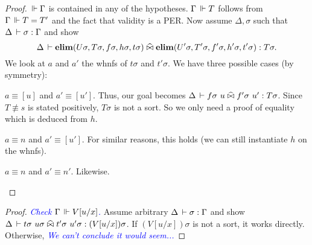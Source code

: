 \documentclass[a4paper,english]{lipics-utf8x}
\newcommand\meta[1]{\noindent\textcolor{blue}{\emph{#1}}}
\begin{document}
  \begin{proof}
    $\,\Vdash \Gamma$ is contained in any of the hypotheses.
    $\Gamma \,\Vdash T$ follows from $\Gamma \,\Vdash T = T'$ and the fact that validity
    is a PER.
    Now assume $\Delta, \sigma$ such that
    $\Delta \,\vdash \sigma : \Gamma$ and
    show
    \[\Delta \,\vdash \operatorname{\mathbf{elim}}(U \sigma,T \sigma,f \sigma,h \sigma,t \sigma) \mathrel{\widehat{\bowtie}}
    \operatorname{\mathbf{elim}}(U' \sigma,T' \sigma,f' \sigma,h' \sigma,t' \sigma) : T \sigma.\]
    We look at $a$ and $a'$ the whnfs of $t \sigma$ and $t' \sigma$.
    We have three possible cases (by symmetry):
    \begin{caselist}
      \nextcase $a \equiv [u]$ and $a' \equiv [u']$.
      Thus, our goal becomes
      $\Delta \der f \sigma\ u \hEr f' \sigma\ u' : T \sigma$.
      Since $T \nequiv s$ is stated positively, $T \sigma$ is not a
      sort. So we only need a proof of equality which is deduced from $h$.

      \nextcase $a \equiv n$ and $a' \equiv [u']$.
      For similar reasons, this holds (we can still instantiate $h$ on the
      whnfs).

      \nextcase $a \equiv n$ and $a' \equiv n'$.
      Likewise.
    \end{caselist}
  \end{proof}

  \begin{lemma}
    \leavevmode
    \begin{mathc}
    \end{mathc}
  \end{lemma}

  \begin{proof}
    \meta{Check $\Gamma \,\Vdash V[u/x]$.}
    Assume arbitrary $\Delta \,\vdash \sigma : \Gamma$ and show
    $\Delta \,\vdash t\sigma\ u\sigma \mathrel{\widehat{\bowtie}} t'\sigma\ u'\sigma : (V[u/x])\sigma$.
    If $(V[u/x])\sigma$ is not a sort, it works directly.
    Otherwise, \meta{We can't conclude it would seem...}
  \end{proof}

  \begin{lemma}
    \leavevmode
    \begin{mathc}
    \end{mathc}
  \end{lemma}
\end{document}
